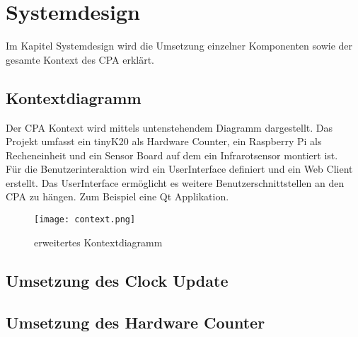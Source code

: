 \section{Systemdesign}
    Im Kapitel Systemdesign wird die Umsetzung einzelner Komponenten sowie der gesamte Kontext des CPA erklärt.
        \subsection{Kontextdiagramm}
        Der CPA Kontext wird mittels untenstehendem Diagramm dargestellt. Das Projekt umfasst ein tinyK20 als Hardware Counter, ein Raspberry Pi als Recheneinheit und ein Sensor Board auf dem ein Infrarotsensor montiert ist.\\
        Für die Benutzerinteraktion wird ein UserInterface definiert und ein Web Client erstellt. Das UserInterface ermöglicht es weitere Benutzerschnittstellen an den CPA zu hängen. Zum Beispiel eine Qt Applikation.
        \begin{figure}[H]
            \centering
            \texttt{[image: context.png]}
            \caption{erweitertes Kontextdiagramm}
            \label{fig:kontext}
        \end{figure}

    	\subsection{Umsetzung des Clock Update} %
        \clearpage
        
		\subsection{Umsetzung des Hardware Counter} %
        \clearpage
        
        \clearpage
        
        \clearpage
        
        \clearpage
		